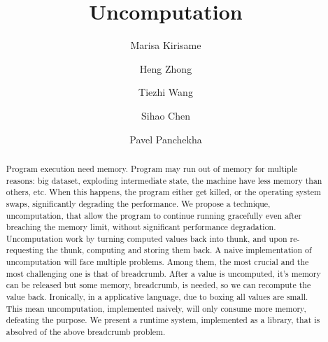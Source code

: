 \documentclass[acmsmall]{acmart}
\begin{document}
\title{Uncomputation}

\author{Marisa Kirisame}
\authornotemark[1]

\author{Heng Zhong}

\author{Tiezhi Wang}

\author{Sihao Chen}

\author{Pavel Panchekha}
\email{}
\authornotemark[1]

\renewcommand{\shortauthors}{Kirisame et al.}

\begin{abstract}
	Program execution need memory. Program may run out of memory for multiple reasons: big dataset, exploding intermediate state, the machine have less memory than others, etc. When this happens, the program either get killed, or the operating system swaps, significantly degrading the performance.
	We propose a technique, uncomputation, that allow the program to continue running gracefully even after breaching the memory limit, without significant performance degradation.
	Uncomputation work by turning computed values back into thunk, and upon re-requesting the thunk, computing and storing them back.
	A naive implementation of uncomputation will face multiple problems. Among them, the most crucial and the most challenging one is that of breadcrumb. After a value is uncomputed, it's memory can be released but some memory, breadcrumb, is needed, so we can recompute the value back.
	Ironically, in a applicative language, due to boxing all values are small. This mean uncomputation, implemented naively, will only consume more memory, defeating the purpose.
	We present a runtime system, implemented as a library, that is absolved of the above breadcrumb problem.
\end{abstract}
\end{document}
